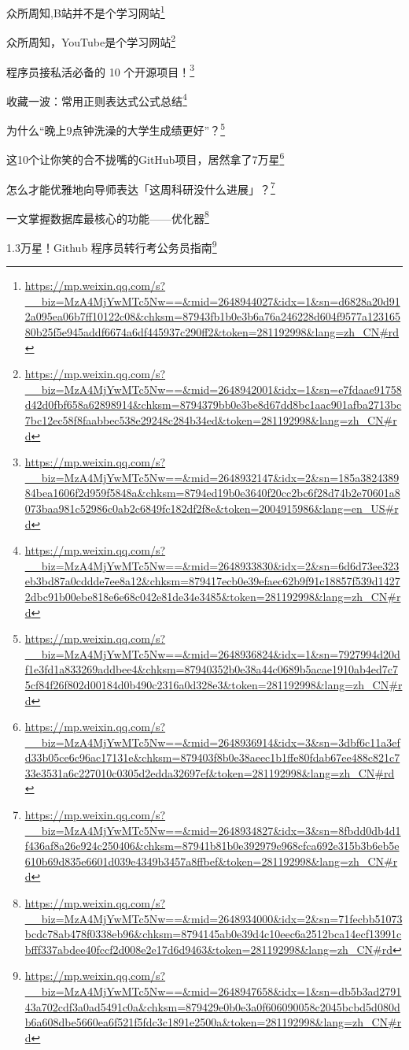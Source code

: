 \documentclass[]{ctexbook}
\renewcommand{\href}[2]{#2\footnote{\url{#1}}}
\begin{document}
\href{https://mp.weixin.qq.com/s?__biz=MzA4MjYwMTc5Nw==\&mid=2648944027\&idx=1\&sn=d6828a20d912a095ea06b7ff10122c08\&chksm=87943fb1b0e3b6a76a246228d604f9577a12316580b25f5e945addf6674a6df445937c290ff2\&token=281192998\&lang=zh_CN\#rd}{众所周知,B站并不是个学习网站}

\href{https://mp.weixin.qq.com/s?__biz=MzA4MjYwMTc5Nw==\&mid=2648942001\&idx=1\&sn=e7fdaae91758d42d0fbf658a62898914\&chksm=8794379bb0e3be8d67dd8bc1aac901afba2713bc7bc12ec58f8faabbec538e29248c284b34ed\&token=281192998\&lang=zh_CN\#rd}{众所周知，YouTube是个学习网站}

\href{https://mp.weixin.qq.com/s?__biz=MzA4MjYwMTc5Nw==\&mid=2648932147\&idx=2\&sn=185a382438984bea1606f2d959f5848a\&chksm=8794ed19b0e3640f20cc2bc6f28d74b2e70601a8073baa981c52986c0ab2c6849fc182df2f8e\&token=2004915986\&lang=en_US\#rd}{程序员接私活必备的 10 个开源项目！}

\href{https://mp.weixin.qq.com/s?__biz=MzA4MjYwMTc5Nw==\&mid=2648933830\&idx=2\&sn=6d6d73ee323eb3bd87a0cddde7ee8a12\&chksm=879417ecb0e39efaec62b9f91c18857f539d14272dbc91b00ebe818e6e68c042e81de34e3485\&token=281192998\&lang=zh_CN\#rd}{收藏一波：常用正则表达式公式总结}

\href{https://mp.weixin.qq.com/s?__biz=MzA4MjYwMTc5Nw==\&mid=2648936824\&idx=1\&sn=7927994d20df1e3fd1a833269addbee4\&chksm=87940352b0e38a44c0689b5acae1910ab4ed7c75cf84f26f802d00184d0b490c2316a0d328e3\&token=281192998\&lang=zh_CN\#rd}{为什么``晚上9点钟洗澡的大学生成绩更好''？}

\href{https://mp.weixin.qq.com/s?__biz=MzA4MjYwMTc5Nw==\&mid=2648936914\&idx=3\&sn=3dbf6c11a3efd33b05ce6c96ac17131e\&chksm=879403f8b0e38aeec1b1ffe80fdab67ee488c821c733e3531a6c227010c0305d2edda32697ef\&token=281192998\&lang=zh_CN\#rd}{这10个让你笑的合不拢嘴的GitHub项目，居然拿了7万星}

\href{https://mp.weixin.qq.com/s?__biz=MzA4MjYwMTc5Nw==\&mid=2648934827\&idx=3\&sn=8fbdd0db4d1f436af8a26e924c250406\&chksm=87941b81b0e392979e968cfca692e315b3b6eb5e610b69d835e6601d039e4349b3457a8ffbef\&token=281192998\&lang=zh_CN\#rd}{怎么才能优雅地向导师表达「这周科研没什么进展」？}

\href{https://mp.weixin.qq.com/s?__biz=MzA4MjYwMTc5Nw==\&mid=2648934000\&idx=2\&sn=71fecbb51073bcdc78ab478f0338eb96\&chksm=8794145ab0e39d4c10eec6a2512bca14ecf13991cbfff337abdee40fccf2d008e2e17d6d9463\&token=281192998\&lang=zh_CN\#rd}{一文掌握数据库最核心的功能------优化器}

\href{https://mp.weixin.qq.com/s?__biz=MzA4MjYwMTc5Nw==\&mid=2648947658\&idx=1\&sn=db5b3ad279143a702cdf3a0ad5491c0a\&chksm=879429e0b0e3a0f606090058c2045bcbd5d080db6a608dbe5660ea6f521f5fdc3c1891e2500a\&token=281192998\&lang=zh_CN\#rd}{1.3万星！Github 程序员转行考公务员指南}
\end{document}
